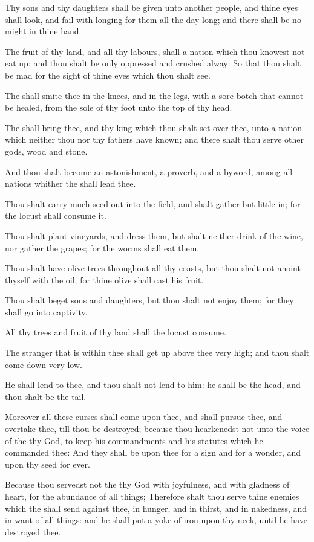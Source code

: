 \verse Thy sons and thy daughters shall be given unto another people, and thine eyes shall look, and fail with longing for them all the day long; and there shall be no might in thine hand.

\verse The fruit of thy land, and all thy labours, shall a nation which thou knowest not eat up; and thou shalt be only oppressed and crushed alway: \verse So that thou shalt be mad for the sight of thine eyes which thou shalt see.

\verse The \LORD shall smite thee in the knees, and in the legs, with a sore botch that cannot be healed, from the sole of thy foot unto the top of thy head.

\verse The \LORD shall bring thee, and thy king which thou shalt set over thee, unto a nation which neither thou nor thy fathers have known; and there shalt thou serve other gods, wood and stone.

\verse And thou shalt become an astonishment, a proverb, and a byword, among all nations whither the \LORD shall lead thee.

\verse Thou shalt carry much seed out into the field, and shalt gather but little in; for the locust shall consume it.

\verse Thou shalt plant vineyards, and dress them, but shalt neither drink of the wine, nor gather the grapes; for the worms shall eat them.

\verse Thou shalt have olive trees throughout all thy coasts, but thou shalt not anoint thyself with the oil; for thine olive shall cast his fruit.

\verse Thou shalt beget sons and daughters, but thou shalt not enjoy them; for they shall go into captivity.

\verse All thy trees and fruit of thy land shall the locust consume.

\verse The stranger that is within thee shall get up above thee very high; and thou shalt come down very low.

\verse He shall lend to thee, and thou shalt not lend to him: he shall be the head, and thou shalt be the tail.

\verse Moreover all these curses shall come upon thee, and shall pursue thee, and overtake thee, till thou be destroyed; because thou hearkenedst not unto the voice of the \LORD thy God, to keep his commandments and his statutes which he commanded thee: \verse And they shall be upon thee for a sign and for a wonder, and upon thy seed for ever.

\verse Because thou servedst not the \LORD thy God with joyfulness, and with gladness of heart, for the abundance of all things; \verse Therefore shalt thou serve thine enemies which the \LORD shall send against thee, in hunger, and in thirst, and in nakedness, and in want of all things: and he shall put a yoke of iron upon thy neck, until he have destroyed thee.

